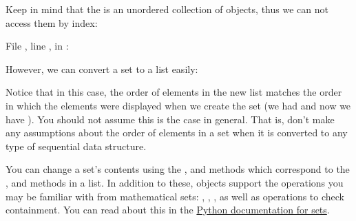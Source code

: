 Keep in mind that the  is an unordered collection of objects,
thus we can not access them by index:

\begin{sphinxVerbatim}[commandchars=\\\{\}]
\PYG{p}{[}\PYG{p}{]}
  File , line , in 
: 
\end{sphinxVerbatim}

However, we can convert a set to a list easily:

\begin{sphinxVerbatim}[commandchars=\\\{\}]
  
\PYG{p}{[}\PYG{p}{]}
\end{sphinxVerbatim}

Notice that in this case, the order of elements in the new list
matches the order in which the elements were displayed when we create
the set (we had  and now we have ). You should not assume this is the case in general. That
is, don't make any assumptions about the order of elements in a set
when it is converted to any type of sequential data structure.

You can change a set's contents using the ,  and
 methods which correspond to the ,  and
 methods in a list. In addition to these,  objects
support the operations you may be familiar with from mathematical
sets: , , , as well as operations to
check containment. You can read about this in the \href{https://docs.python.org/2/library/stdtypes.html\#set}{Python
documentation for sets}.


